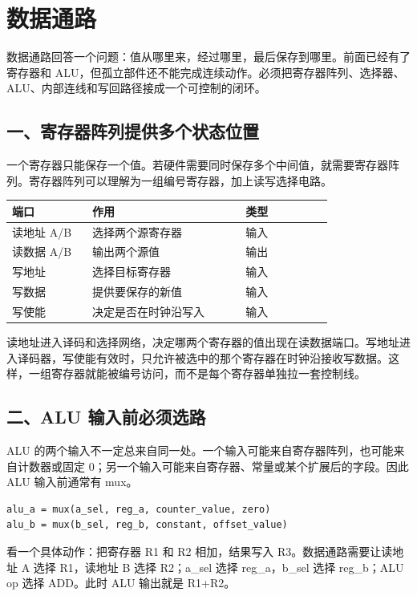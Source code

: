 \chapter{数据通路}

数据通路回答一个问题：值从哪里来，经过哪里，最后保存到哪里。前面已经有了寄存器和 ALU，但孤立部件还不能完成连续动作。必须把寄存器阵列、选择器、ALU、内部连线和写回路径接成一个可控制的闭环。

\section{一、寄存器阵列提供多个状态位置}

一个寄存器只能保存一个值。若硬件需要同时保存多个中间值，就需要寄存器阵列。寄存器阵列可以理解为一组编号寄存器，加上读写选择电路。

\begin{longtable}{p{0.22\linewidth}p{0.42\linewidth}p{0.24\linewidth}}
\toprule
端口 & 作用 & 类型 \\
\midrule
读地址 A/B & 选择两个源寄存器 & 输入 \\
读数据 A/B & 输出两个源值 & 输出 \\
写地址 & 选择目标寄存器 & 输入 \\
写数据 & 提供要保存的新值 & 输入 \\
写使能 & 决定是否在时钟沿写入 & 输入 \\
\bottomrule
\end{longtable}

读地址进入译码和选择网络，决定哪两个寄存器的值出现在读数据端口。写地址进入译码器，写使能有效时，只允许被选中的那个寄存器在时钟沿接收写数据。这样，一组寄存器就能被编号访问，而不是每个寄存器单独拉一套控制线。

\section{二、ALU 输入前必须选路}

ALU 的两个输入不一定总来自同一处。一个输入可能来自寄存器阵列，也可能来自计数器或固定 0；另一个输入可能来自寄存器、常量或某个扩展后的字段。因此 ALU 输入前通常有 mux。

\begin{lstlisting}
alu_a = mux(a_sel, reg_a, counter_value, zero)
alu_b = mux(b_sel, reg_b, constant, offset_value)
\end{lstlisting}

看一个具体动作：把寄存器 R1 和 R2 相加，结果写入 R3。数据通路需要让读地址 A 选择 R1，读地址 B 选择 R2；a\_sel 选择 reg\_a，b\_sel 选择 reg\_b；ALU op 选择 ADD。此时 ALU 输出就是 R1+R2。

